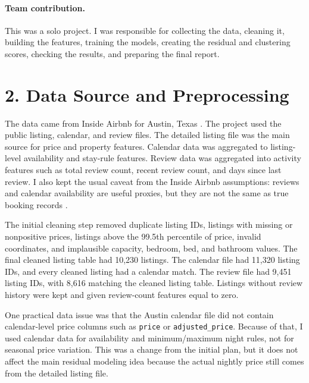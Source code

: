 \documentclass[11pt]{article}
\begin{document}
\paragraph{Team contribution.} This was a solo project. I was responsible for collecting the data, cleaning it, building the features, training the models, creating the residual and clustering scores, checking the results, and preparing the final report.

\section*{2. Data Source and Preprocessing}

The data came from Inside Airbnb for Austin, Texas \cite{insideairbnb_data}. The project used the public listing, calendar, and review files. The detailed listing file was the main source for price and property features. Calendar data was aggregated to listing-level availability and stay-rule features. Review data was aggregated into activity features such as total review count, recent review count, and days since last review. I also kept the usual caveat from the Inside Airbnb assumptions: reviews and calendar availability are useful proxies, but they are not the same as true booking records \cite{insideairbnb_assumptions}.

The initial cleaning step removed duplicate listing IDs, listings with missing or nonpositive prices, listings above the 99.5th percentile of price, invalid coordinates, and implausible capacity, bedroom, bed, and bathroom values. The final cleaned listing table had 10,230 listings. The calendar file had 11,320 listing IDs, and every cleaned listing had a calendar match. The review file had 9,451 listing IDs, with 8,616 matching the cleaned listing table. Listings without review history were kept and given review-count features equal to zero.

One practical data issue was that the Austin calendar file did not contain calendar-level price columns such as \texttt{price} or \texttt{adjusted\_price}. Because of that, I used calendar data for availability and minimum/maximum night rules, not for seasonal price variation. This was a change from the initial plan, but it does not affect the main residual modeling idea because the actual nightly price still comes from the detailed listing file.
\end{document}
